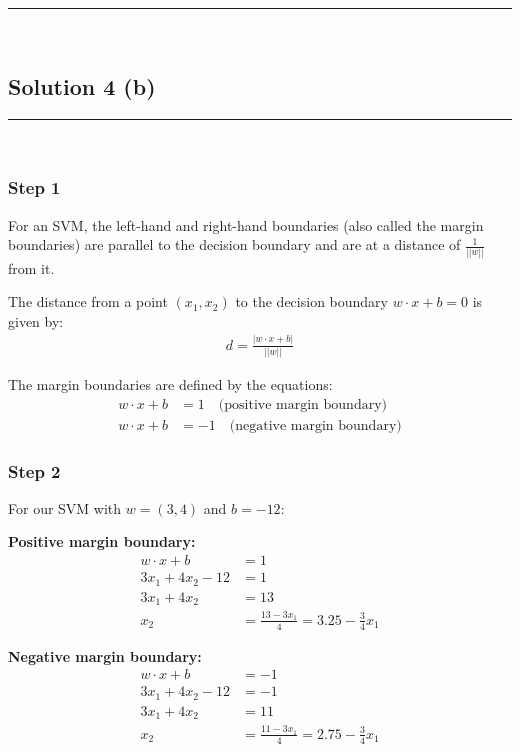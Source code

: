 \documentclass{article}
\begin{document}
\noindent\rule{\textwidth}{0.4pt}\\

\newpage

\subsection*{Solution 4 (b)}
\noindent\rule{\textwidth}{0.4pt}\\

\subsubsection*{Step 1}
\parbox{\textwidth}{
For an SVM, the left-hand and right-hand boundaries (also called the margin boundaries) are parallel to the decision boundary and are at a distance of $\frac{1}{||w||}$ from it.

The distance from a point $(x_1, x_2)$ to the decision boundary $w \cdot x + b = 0$ is given by:
\begin{align}
d = \frac{|w \cdot x + b|}{||w||}
\end{align}

The margin boundaries are defined by the equations:
\begin{align}
w \cdot x + b &= 1 \quad \text{(positive margin boundary)}\\
w \cdot x + b &= -1 \quad \text{(negative margin boundary)}
\end{align}
}

\subsubsection*{Step 2}
\parbox{\textwidth}{
For our SVM with $w = (3, 4)$ and $b = -12$:

\textbf{Positive margin boundary:}
\begin{align}
w \cdot x + b &= 1\\
3x_1 + 4x_2 - 12 &= 1\\
3x_1 + 4x_2 &= 13\\
x_2 &= \frac{13 - 3x_1}{4} = 3.25 - \frac{3}{4}x_1
\end{align}

\textbf{Negative margin boundary:}
\begin{align}
w \cdot x + b &= -1\\
3x_1 + 4x_2 - 12 &= -1\\
3x_1 + 4x_2 &= 11\\
x_2 &= \frac{11 - 3x_1}{4} = 2.75 - \frac{3}{4}x_1
\end{align}
}
\end{document}
